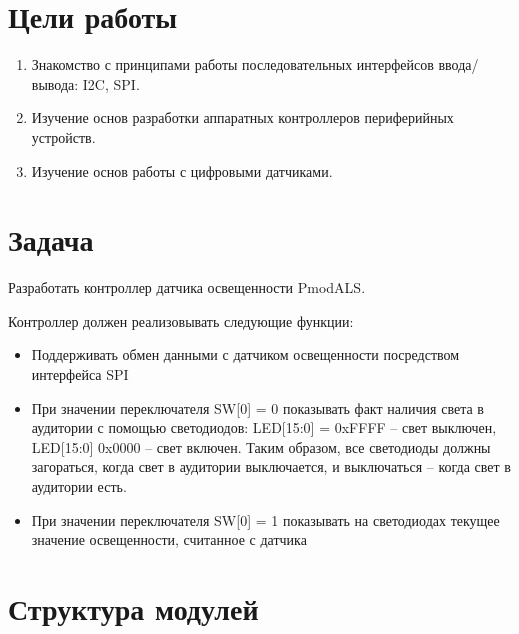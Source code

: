 

\usepackage{graphicx}
\fancyhead[LR]{}

\def \labnum {2}
\def \labsubj {Схемотехника ЭВМ}
\def \labauthor {Айтуганов Д. А. \\ Чебыкин И. Б.}
\def \labgroup {P3301}
\def \labinsp {Баевских А. Н.}
\def \labname {Вариант: 2}

\isnametrue
\isonefalse
\lstset{
	caption=\lstname,
	captionpos=t,
	basicstyle=\ttfamily\selectfont\scriptsize
}



\tableofcontents
\newpage
\section{Цели работы}
\begin{enumerate}
\item Знакомство с принципами работы последовательных интерфейсов ввода/вывода: I2C, SPI.
\item Изучение основ разработки аппаратных контроллеров периферийных устройств.
\item Изучение основ работы с цифровыми датчиками.
\end{enumerate}

\section{Задача}
Разработать контроллер датчика освещенности PmodALS.

Контроллер должен реализовывать следующие функции:
\begin{itemize}
\item Поддерживать обмен данными с датчиком освещенности посредством интерфейса SPI
\item При значении переключателя SW[0] = 0 показывать факт наличия света в
аудитории с помощью светодиодов: LED[15:0] = 0xFFFF – свет выключен,
LED[15:0] 0x0000 – свет включен. Таким образом, все светодиоды должны
загораться, когда свет в аудитории выключается, и выключаться – когда свет в
аудитории есть.
\item При значении переключателя SW[0] = 1 показывать на светодиодах текущее
значение освещенности, считанное с датчика
\end{itemize}

\section{Структура модулей}


